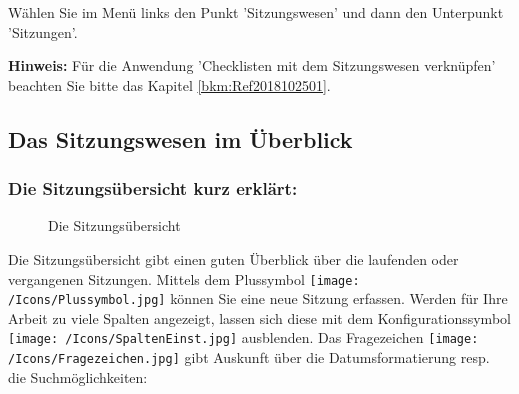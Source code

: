 Wählen Sie im Menü links den Punkt 'Sitzungswesen' und dann den Unterpunkt 'Sitzungen'.

\vspace{\baselineskip}

\textbf{Hinweis:} Für die Anwendung 'Checklisten mit dem Sitzungswesen verknüpfen' beachten Sie bitte das Kapitel \ref{bkm:Ref2018102501}.

\vspace{5cm}

\subsection{Das Sitzungswesen im Überblick}
\subsubsection{Die Sitzungsübersicht kurz erklärt:}

\begin{figure}[H]
\caption{Die Sitzungsübersicht}
\end{figure}

Die Sitzungsübersicht gibt einen guten Überblick über die laufenden oder vergangenen Sitzungen. Mittels dem Plussymbol \texttt{[image: /Icons/Plussymbol.jpg]}  können Sie eine neue Sitzung erfassen. Werden für Ihre Arbeit zu viele Spalten angezeigt, lassen sich diese mit dem Konfigurationssymbol \texttt{[image: /Icons/SpaltenEinst.jpg]}  ausblenden. Das Fragezeichen \texttt{[image: /Icons/Fragezeichen.jpg]}  gibt Auskunft über die Datumsformatierung resp. die Suchmöglichkeiten: 

\begin{figure}[H]
\end{figure}

